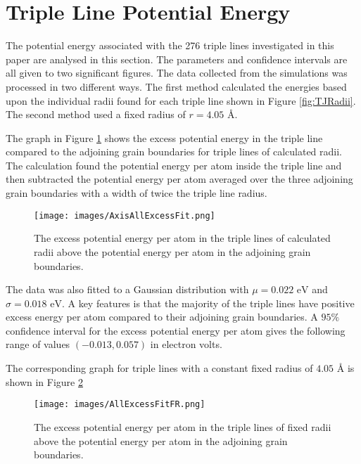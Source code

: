 \documentclass[12pt,a4paper,openany]{report}
\newcommand{\ts}[1]{\textrm{#1}}
\begin{document}
\newpage
\section{Triple Line Potential Energy} \label{sec:TLPE}

The potential energy associated with the 276 triple lines investigated in this paper are analysed in this section. The parameters and confidence intervals are all given to two significant figures. The data collected from the simulations was processed in two different ways. The first method calculated the energies based upon the individual radii found for each triple line shown in Figure \ref{fig:TJRadii}. The second method used a fixed radius of $r = 4.05 \textrm{ \AA}$. 

The graph in Figure \ref{fig:ExcessPEVR} shows the excess potential energy in the triple line compared to the adjoining grain boundaries for triple lines of calculated radii. The calculation found the potential energy per atom inside the triple line and then subtracted the potential energy per atom averaged over the three adjoining grain boundaries with a width of twice the triple line radius. 
 

\begin{figure}[H]
	\texttt{[image: images/AxisAllExcessFit.png]}
	\caption{The excess potential energy per atom in the triple lines of calculated radii above the potential energy per atom in the adjoining grain boundaries.} 
	\label{fig:ExcessPEVR}
\end{figure}

The data was also fitted to a Gaussian distribution with $\mu = 0.022 \ts{ eV}$ and $\sigma = 0.018 \ts{ eV}$. A key features is that the majority of the triple lines have positive excess energy per atom compared to their adjoining grain boundaries. A $95\%$ confidence interval for the excess potential energy per atom
gives the following range of values $(-0.013, 0.057)$ in electron volts.

The corresponding graph for triple lines with a constant fixed radius of $4.05 \textrm{ \AA}$ is shown in Figure \ref{fig:ExcessPEFR}

\begin{figure}[H]
	\texttt{[image: images/AllExcessFitFR.png]} 
	\caption{The excess potential energy per atom in the triple lines of fixed radii above the potential energy per atom in the adjoining grain boundaries.}
	\label{fig:ExcessPEFR}
\end{figure}
\end{document}
